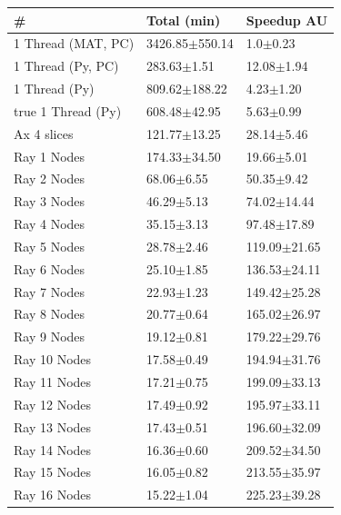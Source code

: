 \documentclass[12pt, a4paper]{article}
\begin{document}
\begin{appendices}
\begin{table}[H]
    \centering
    \begin{tabular}{|l|l|l|}
    \hline
    \#                 & Total (min)        & Speedup AU       \\ \hline
    1 Thread (MAT, PC) & 3426.85$\pm$550.14 & 1.0$\pm$0.23     \\ \hline
    1 Thread (Py, PC)  & 283.63$\pm$1.51    & 12.08$\pm$1.94   \\ \hline
    1 Thread (Py)      & 809.62$\pm$188.22  & 4.23$\pm$1.20    \\ \hline
    true 1 Thread (Py) & 608.48$\pm$42.95   & 5.63$\pm$0.99    \\ \hline
    Ax 4 slices        & 121.77$\pm$13.25   & 28.14$\pm$5.46   \\ \hline
    Ray 1 Nodes        & 174.33$\pm$34.50   & 19.66$\pm$5.01   \\ \hline
    Ray 2 Nodes        & 68.06$\pm$6.55     & 50.35$\pm$9.42   \\ \hline
    Ray 3 Nodes        & 46.29$\pm$5.13     & 74.02$\pm$14.44  \\ \hline
    Ray 4 Nodes        & 35.15$\pm$3.13     & 97.48$\pm$17.89  \\ \hline
    Ray 5 Nodes        & 28.78$\pm$2.46     & 119.09$\pm$21.65 \\ \hline
    Ray 6 Nodes        & 25.10$\pm$1.85     & 136.53$\pm$24.11 \\ \hline
    Ray 7 Nodes        & 22.93$\pm$1.23     & 149.42$\pm$25.28 \\ \hline
    Ray 8 Nodes        & 20.77$\pm$0.64     & 165.02$\pm$26.97 \\ \hline
    Ray 9 Nodes        & 19.12$\pm$0.81     & 179.22$\pm$29.76 \\ \hline
    Ray 10 Nodes       & 17.58$\pm$0.49     & 194.94$\pm$31.76 \\ \hline
    Ray 11 Nodes       & 17.21$\pm$0.75     & 199.09$\pm$33.13 \\ \hline
    Ray 12 Nodes       & 17.49$\pm$0.92     & 195.97$\pm$33.11 \\ \hline
    Ray 13 Nodes       & 17.43$\pm$0.51     & 196.60$\pm$32.09 \\ \hline
    Ray 14 Nodes       & 16.36$\pm$0.60     & 209.52$\pm$34.50 \\ \hline
    Ray 15 Nodes       & 16.05$\pm$0.82     & 213.55$\pm$35.97 \\ \hline
    Ray 16 Nodes       & 15.22$\pm$1.04     & 225.23$\pm$39.28 \\ \hline

\end{tabular}
\end{table}
\end{appendices}
\end{document}
